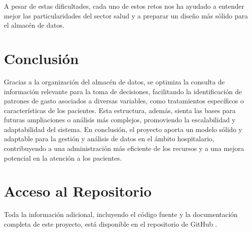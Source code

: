 \documentclass{article}
\begin{document}
A pesar de estas dificultades, cada uno de estos retos nos ha ayudado a entender mejor las particularidades del sector salud y a preparar un diseño más sólido para el almacén de datos.

\section{Conclusión}
\label{sec:conclusion}

Gracias a la organización del almacén de datos, se optimiza la consulta de información relevante para la toma de decisiones, facilitando la identificación de patrones de gasto asociados a diversas variables, como tratamientos específicos o características de los pacientes. Esta estructura, además, sienta las bases para futuras ampliaciones o análisis más complejos, promoviendo la escalabilidad y adaptabilidad del sistema. En conclusión, el proyecto aporta un modelo sólido y adaptable para la gestión y análisis de datos en el ámbito hospitalario, contribuyendo a una administración más eficiente de los recursos y a una mejora potencial en la atención a los pacientes.

\newpage
\section{Acceso al Repositorio}

Toda la información adicional, incluyendo el código fuente y la documentación completa de este proyecto, está disponible en el repositorio de GitHub \cite{silva2024github}.

\end{document}
